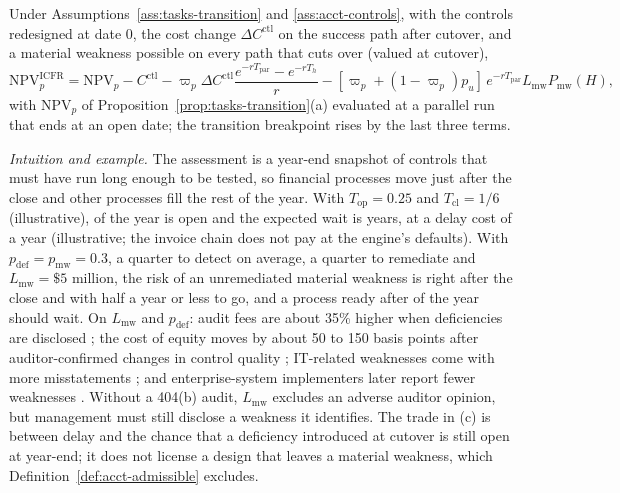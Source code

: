 \begin{corollary}\label{cor:acct-npv}
Under Assumptions~\ref{ass:tasks-transition} and \ref{ass:acct-controls}, with the controls redesigned at date 0, the cost change $\Delta C^{\mathrm{ctl}}$ on the success path after cutover, and a material weakness possible on every path that cuts over (valued at cutover),
\begin{equation}\label{eq:acct-npv}
\mathrm{NPV}^{\mathrm{ICFR}}_p=\mathrm{NPV}_p-C^{\mathrm{ctl}}-\varpi_p\Delta C^{\mathrm{ctl}}\frac{e^{-rT_{\mathrm{par}}}-e^{-rT_h}}r-[\varpi_p+(1-\varpi_p)p_u]\,e^{-rT_{\mathrm{par}}}L_{\mathrm{mw}}P_{\mathrm{mw}}(H),
\end{equation}
with $\mathrm{NPV}_p$ of Proposition~\ref{prop:tasks-transition}(a) evaluated at a parallel run that ends at an open date; the transition breakpoint rises by the last three terms.
\end{corollary}

\noindent\emph{Intuition and example.} The assessment is a year-end snapshot of controls that must have run long enough to be tested, so financial processes move just after the close and other processes fill the rest of the year. With $T_{\mathrm{op}}=0.25$ and $T_{\mathrm{cl}}=1/6$ (illustrative), \acctCutOpen{} of the year is open and the expected wait is \acctCutWait{} years, \acctCutCost{} at a delay cost of \acctCutDelay{} a year (illustrative; the invoice chain does not pay at the engine's defaults). With $p_{\mathrm{def}}=p_{\mathrm{mw}}=0.3$, a quarter to detect on average, a quarter to remediate and $L_{\mathrm{mw}}=\$5$ million, the risk of an unremediated material weakness is \acctCutPafter{} right after the close and \acctCutPlate{} with half a year or less to go, and a process ready after \acctCutZstar{} of the year should wait. On $L_{\mathrm{mw}}$ and $p_{\mathrm{def}}$: audit fees are about 35\% higher when deficiencies are disclosed \citep{hogan2008evidence}; the cost of equity moves by about 50 to 150 basis points after auditor-confirmed changes in control quality \citep{ashbaughskaife2009effect}; IT-related weaknesses come with more misstatements \citep{klamm2009sox}; and enterprise-system implementers later report fewer weaknesses \citep{morris2011impact}. Without a 404(b) audit, $L_{\mathrm{mw}}$ excludes an adverse auditor opinion, but management must still disclose a weakness it identifies. The trade in (c) is between delay and the chance that a deficiency introduced at cutover is still open at year-end; it does not license a design that leaves a material weakness, which Definition~\ref{def:acct-admissible} excludes.

